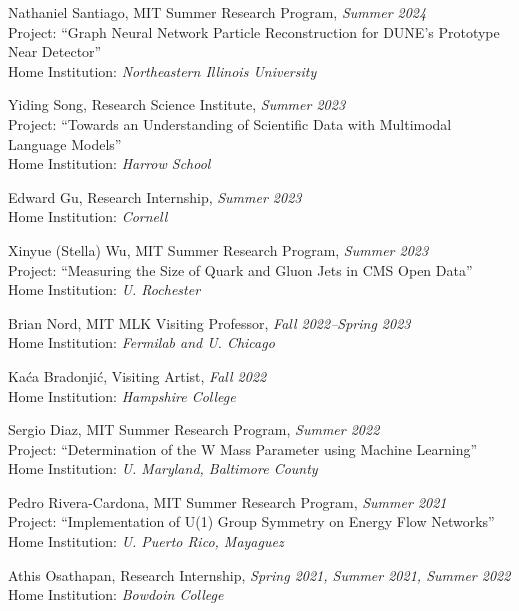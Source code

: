 \bbl

\item Nathaniel Santiago, MIT Summer Research Program, \emph{Summer 2024}
\\ Project: ``Graph Neural Network Particle Reconstruction for DUNE's Prototype Near Detector''
\\ Home Institution: \emph{Northeastern Illinois University}

\item Yiding Song, Research Science Institute, \emph{Summer 2023}
\\ Project: ``Towards an Understanding of Scientific Data with Multimodal Language Models''
\\ Home Institution: \emph{Harrow School}

\item Edward Gu, Research Internship, \emph{Summer 2023}
\\ Home Institution: \emph{Cornell}

\item Xinyue (Stella) Wu, MIT Summer Research Program, \emph{Summer 2023}
\\ Project: ``Measuring the Size of Quark and Gluon Jets in CMS Open Data''
\\ Home Institution: \emph{U. Rochester}

\item Brian Nord, MIT MLK Visiting Professor, \emph{Fall 2022--Spring 2023}
\\ Home Institution: \emph{Fermilab and U. Chicago}

\item Kaća Bradonjić, Visiting Artist, \emph{Fall 2022}
\\ Home Institution: \emph{Hampshire College}

\item Sergio Diaz, MIT Summer Research Program, \emph{Summer 2022}
\\ Project: ``Determination of the W Mass Parameter using Machine Learning''
\\ Home Institution: \emph{U. Maryland, Baltimore County}

\item Pedro Rivera-Cardona, MIT Summer Research Program, \emph{Summer 2021}
\\ Project: ``Implementation of U(1) Group Symmetry on Energy Flow Networks''
\\ Home Institution: \emph{U. Puerto Rico, Mayaguez}

\item Athis Osathapan, Research Internship, \emph{Spring 2021, Summer 2021, Summer 2022}
\\ Home Institution: \emph{Bowdoin College}

